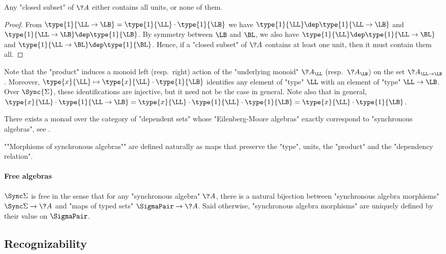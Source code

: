 \begin{fact}
	\AP\label{fact:closed-subset-units}
	Any "closed subset" of $\?A$ either contains all units, or none of them.
\end{fact}

\begin{proof}
	From $\type{1}{\LL \to \LB} = \type{1}{\LL}\cdot \type{1}{\LB}$ we have
	$\type{1}{\LL} \dep \type{1}{\LL \to \LB}$
	and $\type{1}{\LL \to \LB} \dep \type{1}{\LB}$.
	By symmetry between $\LB$ and $\BL$, we also have
	$\type{1}{\LL} \dep \type{1}{\LL\to\BL}$ and $\type{1}{\LL\to\BL} \dep \type{1}{\BL}$.
	Hence, if a "closed subset" of $\?A$ contains at least one unit, then it must contain them all.
\end{proof}

Note that the "product" induces a monoid left (resp.~right) action of the
"underlying monoid" $\?A_{\LL}$ (resp.~$\?A_{\LB}$) on the set $\?A_{\LL\to\LB}$.
Moreover, $\type{x}{\LL} \mapsto \type{x}{\LL} \cdot \type{1}{\LB}$
identifies any element of "type" $\LL$ with an element of "type" $\LL\to\LB$.
Over $\Sync{\Sigma}$, these identifications are injective, but it need not be the
case in general. Note also that in general,
$\type{x}{\LL} \cdot \type{1}{\LL\to\LB} = \type{x}{\LL} \cdot \type{1}{\LL}
\cdot \type{1}{\LB} = \type{x}{\LL} \cdot \type{1}{\LB}$.

\begin{remark}
	There exists a monad over the category of "dependent sets" whose
	"Eilenberg-Moore algebras" exactly correspond to
	"synchronous algebras", see .
\end{remark}

\AP""Morphisms of synchronous algebras"" are defined naturally as
maps that preserve the "type", units, the "product" and the "dependency relation".

\paragraph*{Free algebras}
$\Sync\Sigma$ is free in the sense that
for any "synchronous algebra" $\?A$, there is a natural bijection between
"synchronous algebra morphisms" $\Sync\Sigma \to \?A$
and "maps of typed sets" $\SigmaPair \to \?A$.
Said otherwise, "synchronous algebra morphisms" are uniquely defined by
their value on $\SigmaPair$.

\subsection{Recognizability}

